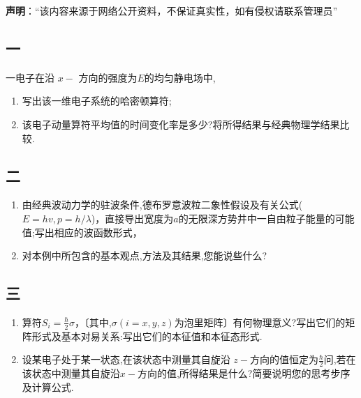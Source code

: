 
\textbf{声明}：“该内容来源于网络公开资料，不保证真实性，如有侵权请联系管理员”

\subsection{一}
一电子在沿 $x-$ 方向的强度为$E$的均匀静电场中,
\begin{enumerate}
\item 写出该一维电子系统的哈密顿算符;
\item 该电子动量算符平均值的时间变化率是多少?将所得结果与经典物理学结果比较.
\end{enumerate}
\subsection{二}
\begin{enumerate}
\item 由经典波动力学的驻波条件,德布罗意波粒二象性假设及有关公式($E=hv,p=h/\lambda$)，直接导出宽度为$a$的无限深方势井中一自由粒子能量的可能值;写出相应的波函数形式，
\item 对本例中所包含的基本观点,方法及其结果,您能说些什么?
\end{enumerate}
\subsection{三}
\begin{enumerate}
\item 算符$S_i=\frac{\hbar}{2}\sigma$，〔其中,$\sigma(i=x,y,z)$为泡里矩阵〕有何物理意义?写出它们的矩阵形式及基本对易关系:写出它们的本征值和本征态形式.
\item 设某电子处于某一状态,在该状态中测量其自旋沿 $z-$方向的值恒定为$\frac{\hbar}{2}$问,若在该状态中测量其自旋沿$x-$方向的值,所得结果是什么?简要说明您的思考步序及计算公式.
\end{enumerate}
